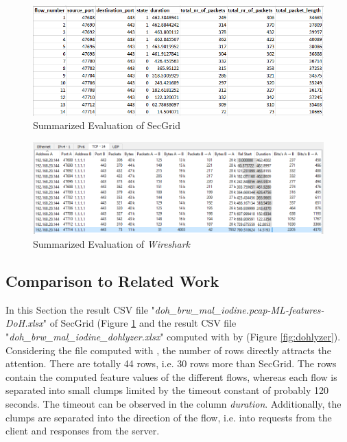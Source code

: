 \begin{figure} [h]
\includegraphics[scale=0.7]{images/eval_sg.PNG}
\centering
\caption{Summarized Evaluation of SecGrid}
\label{fig:sg}
\end{figure}

\begin{figure} [h]
\includegraphics[scale=0.65]{images/eval_ws.PNG}
\centering
\caption{Summarized Evaluation of \textit{Wireshark}}
\label{fig:ws}
\end{figure}

\subsection{Comparison to Related Work} \label{comp_dohlyzer}
In this Section the result CSV file "\textit{doh\_brw\_mal\_iodine.pcap-ML-features-DoH.xlsx}" of SecGrid (Figure \ref{fig:sg}  and the result CSV file "\textit{doh\_brw\_mal\_iodine\_dohlyzer.xlsx}" computed with \cite{DoHlyzer} by \cite{montazerishatoori2020anomaly} (Figure \ref{fig:dohlyzer}). Considering the file computed with \cite{DoHlyzer}, the number of rows directly attracts the attention. There are totally 44 rows, i.e. 30 rows more than SecGrid. The rows contain the computed feature values of the different flows, whereas each flow is separated into small clumps limited by the timeout constant of probably 120 seconds. The timeout can be observed in the column \textit{duration}. Additionally, the clumps are separated into the direction of the flow, i.e. into requests from the client and responses from the server.

